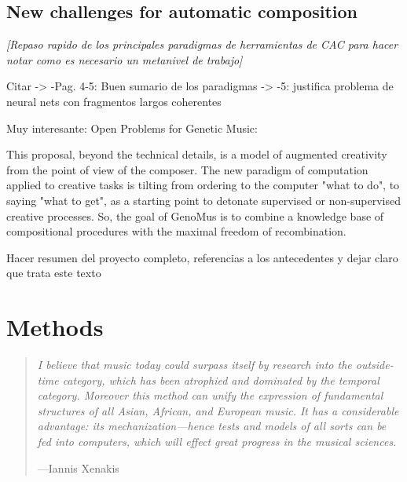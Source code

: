 \documentclass{article}
\begin{document}
\subsection{New challenges for automatic composition}




{\color{gray} \textsl{[Repaso rapido de los principales paradigmas de herramientas de CAC para hacer notar como es necesario un metanivel de trabajo]}}

{\color{red}
Citar \cite{Nierhaus:2008:ACP:1524239}
	-> -Pag. 4-5: Buen sumario de los paradigmas
	-> -5: justifica problema de neural nets con fragmentos largos coherentes 

Muy interesante: Open Problems for Genetic Music: \cite{DBLP:conf/evoW/McCormack05}
}

This proposal, beyond the technical details, is a model of augmented creativity from the point of view of the composer. The new paradigm of computation applied to creative tasks is tilting from ordering to the computer "what to do", to saying "what to get", as a starting point to detonate supervised or non-supervised creative processes. So, the goal of GenoMus is to combine a knowledge base of compositional procedures with the maximal freedom of recombination. 



Hacer resumen del proyecto completo, referencias a los antecedentes y dejar claro que trata este texto



\section{Methods}
\begin{samepage}
\begin{quotation}
\textsl{I believe that music today could surpass itself by research into the outside-time category, which has been atrophied and dominated by the
temporal category. Moreover this method can unify the expression of
fundamental structures of all Asian, African, and European music. It has a
considerable advantage: its mechanization---hence tests and models of
all sorts can be fed into computers, which will effect great progress in the
musical sciences.}

---Iannis Xenakis \cite{xenakis1971formalized}
\end{quotation}
\end{samepage}
\end{document}
